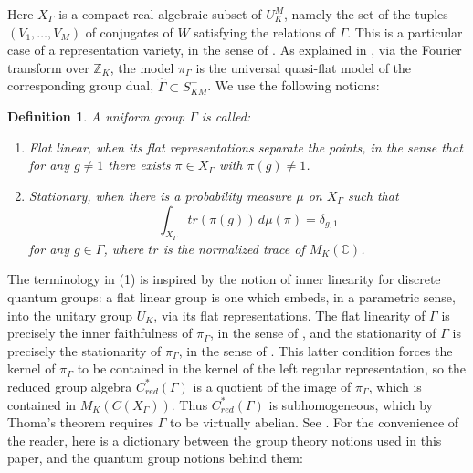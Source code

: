 \documentclass[12pt]{amsart}
\newtheorem{definition}[theorem]{Definition}
\theoremstyle{definition}
\begin{document}
Here $X_\Gamma$ is a compact real algebraic subset of $U_K^M$, namely the set of the tuples $(V_1,\ldots,V_M)$ of conjugates of $W$ satisfying the relations of $\Gamma$. This is a particular case of a representation variety, in the sense of \cite{lma,sik}. As explained in \cite{bc2,bfr}, via the Fourier transform over $\mathbb Z_K$, the model $\pi_\Gamma$ is the universal quasi-flat model of the corresponding group dual, $\widehat{\Gamma}\subset S_{KM}^+$. We use the following notions:

\begin{definition}
A uniform group $\Gamma$ is called:
\begin{enumerate}
\item Flat linear, when its flat representations separate the points, in the sense that for any $g\neq1$ there exists $\pi\in X_\Gamma$ with $\pi(g)\neq1$.

\item Stationary, when there is a probability measure $\mu$ on $X_\Gamma$ such that
$$\int_{X_\Gamma}tr(\pi(g))\,d\mu(\pi)=\delta_{g,1}$$
for any $g\in\Gamma$, where $tr$ is the normalized trace of $M_K(\mathbb C)$.
\end{enumerate}
\end{definition}

The terminology in (1) is inspired by the notion of inner linearity for discrete quantum groups: a flat linear group is one which embeds, in a parametric sense, into the unitary group $U_K$, via its flat representations. The flat linearity of $\Gamma$ is precisely the inner faithfulness of $\pi_\Gamma$, in the sense of \cite{bbi}, and the stationarity of $\Gamma$ is precisely the stationarity of $\pi_\Gamma$, in the sense of \cite{bfr}. This latter condition forces the kernel of $\pi_\Gamma$ to be contained in the kernel of the left regular representation, so the reduced group algebra $C^*_{red}(\Gamma)$ is a quotient of the image of $\pi_\Gamma$, which is contained in $M_K(C(X_\Gamma))$. Thus $C^*_{red}(\Gamma)$ is subhomogeneous, which by Thoma's theorem \cite{tho} requires $\Gamma$ to be virtually abelian. See \cite{bc1}. For the convenience of the reader, here is a dictionary between the group theory notions used in this paper, and the quantum group notions behind them:

\vspace{4mm}
\end{document}
